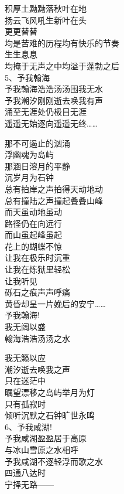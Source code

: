 \documentclass{article}
\begin{document}
积厚土黝黝落秋叶在地\\
扬云飞风吼生新叶在头\\
更更替替\\
均是苦难的历程均有快乐的节奏\\
生生息息
\\
均掩于无声之中均溢于蓬勃之后 \\ 


5、予我翰海\\
予我翰海浩浩汤汤围我无水
\\
予我潮汐刚刚逝去唤我有声 \\ 


涌至无涯处仍极目无涯\\
遥遥无始逐向遥遥无终……\\
\newpage

那不可遏止的汹涌\\
浮幽魂为岛屿\\
那涵日溶月的平静
\\
沉岁月为石钟 \\ 


总有拍岸之声拍得天动地动\\
总有撞陆之声撞起叠叠山峰\\
而天虽动地虽动\\
路径仍在向远行\\
而山虽起峰虽起
\\
花上的蝴蝶不惊 \\ 


让我在极乐时沉重\\
让我在炼狱里轻松\\
让我听见\\
砾石之痕声声呼痛
\\
黄昏却呈一片娩后的安宁…… \\ 


予我翰海!\\
我无阔以盛\\
翰海浩浩汤汤之水\\
\newpage

我无籁以应
\\
潮汐逝去唤我之声 \\ 


只在迷茫中\\
瞩望漂移之岛屿举月为灯\\
只有孤寂时
\\
倾听沉默之石钟旷世永鸣 \\ 


6、予我咸湖!\\
予我咸湖盈盈居于高原\\
与冰山雪原之水相呼\\
予我咸湖不逐轻浮而歌之水\\
四通八达时
\\
宁择无路—— \\ 
\end{document}
